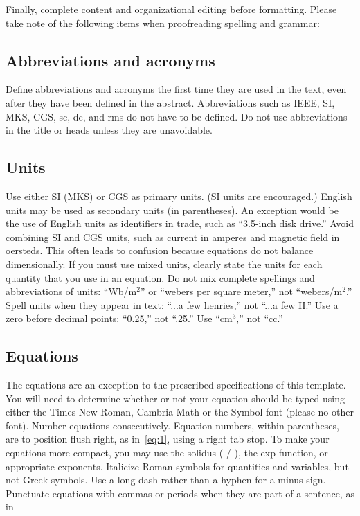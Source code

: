 \documentclass[10pt,twoside,twocolumn,a4paper]{article}
\begin{document}
Finally, complete content and organizational editing before formatting. Please take note of the following items when proofreading spelling and grammar:

\subsection{Abbreviations and acronyms}
Define abbreviations and acronyms the first time they are used in the text, even after they have been defined in the abstract. Abbreviations such as IEEE, SI, MKS, CGS, sc, dc, and rms do not have to be defined. Do not use abbreviations in the title or heads unless they are unavoidable.

\subsection{Units}
Use either SI (MKS) or CGS as primary units. (SI units are encouraged.) English units may be used as secondary units (in parentheses). An exception would be the use of English units as identifiers in trade, such as ``3.5-inch disk drive.''
Avoid combining SI and CGS units, such as current in amperes and magnetic field in oersteds. This often leads to confusion because equations do not balance dimensionally. If you must use mixed units, clearly state the units for each quantity that you use in an equation.
Do not mix complete spellings and abbreviations of units: ``Wb/m$^2$'' or “webers per square meter,” not “webers/m$^2$.” Spell units when they appear in text: “...a few henries,” not “...a few H.”
Use a zero before decimal points: “0.25,” not “.25.” Use “cm$^3$,” not “cc.”

\subsection{Equations}
The equations are an exception to the prescribed specifications of this template. You will need to determine whether or not your equation should be typed using either the Times New Roman, Cambria Math or the Symbol font (please no other font). 
Number equations consecutively. Equation numbers, within parentheses, are to position flush right, as in~\eqref{eq:1}, using a right tab stop. To make your equations more compact, you may use the solidus ( / ), the exp function, or appropriate exponents. Italicize Roman symbols for quantities and variables, but not Greek symbols. Use a long dash rather than a hyphen for a minus sign. Punctuate equations with commas or periods when they are part of a sentence, as in
\end{document}
